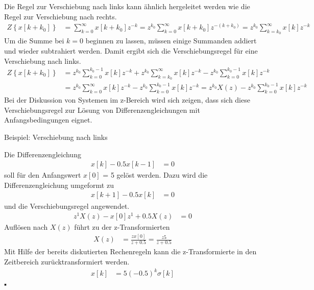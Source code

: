 Die Regel zur Verschiebung nach links kann ähnlich hergeleitet werden wie die Regel zur Verschiebung nach rechts.
\begin{align}
Z\left\{ x[ k + k_{0}] \right\} &= \sum\limits_{k = 0}^{\infty}{x[ k + k_{0}]  z^{- k}} = z^{k_{0}}  \sum\limits_{k = 0}^{\infty}{x[ k + k_{0}]  z^{- (k + k_{0})}} = z^{k_{0}}  \sum\limits_{k = k_{0}}^{\infty}{x[ k]  z^{- k}} \label{eq:5.44}
\end{align}
Um die Summe bei \(k = 0\) beginnen zu lassen, müssen einige Summanden addiert und wieder subtrahiert werden. Damit ergibt sich die Verschiebungsregel für eine Verschiebung nach links.
\begin{align}
{\boldsymbol{\mathit{Z}}\left\{x\left[k+k_{0} \right]\right\}} &=  {z^{k_{0} }  \sum\limits _{k=0}^{k_{0} -1}x\left[k\right] z^{-k}  +z^{k_{0} }  \sum\limits _{k=k_{0} }^{\infty }x\left[k\right] z^{-k}  -z^{k_{0} }  \sum\limits _{k=0}^{k_{0} -1}x\left[k\right] z^{-k}  } \\
{} &=  {z^{k_{0} }  \sum\limits _{k=0}^{\infty }x\left[k\right] z^{-k}  -z^{k_{0} }  \sum\limits _{k=0}^{k_{0} -1}x\left[k\right] z^{-k}  =z^{k_{0} }  X\left(z\right)-z^{k_{0} }  \sum\limits _{k=0}^{k_{0} -1}x\left[k\right] z^{-k}  }
\label{eq:5.45}
\end{align}
Bei der Diskussion von Systemen im z-Bereich wird sich zeigen, dass sich diese Verschiebungsregel zur Lösung von Differenzengleichungen mit Anfangsbedingungen eignet.

Beispiel: Verschiebung nach links

Die Differenzengleichung
\begin{align}
x[ k] - 0.5  x[ k - 1] &= 0 \label{eq:5.46}
\end{align}
soll für den Anfangswert \(x[0]\) = 5 gelöst werden. Dazu wird die Differenzengleichung umgeformt zu
\begin{align}
x[ k + 1] - 0.5  x[ k] &= 0 \label{eq:5.47}
\end{align}
und die Verschiebungsregel angewendet.
\begin{align}
z^{1}  X(z) - x[ 0]  z^{1} + 0.5  X(z) &= 0 \label{eq:5.48}
\end{align}
Auflösen nach \(X(z)\) führt zu der z-Transformierten
\begin{align}
X(z) &= \frac{z  x[ 0]}{z + 0.5} = \frac{z  5}{z + 0.5} \label{eq:5.49}
\end{align}
Mit Hilfe der bereits diskutierten Rechenregeln kann die z-Transformierte in den Zeitbereich zurücktransformiert werden.
\begin{align}
x[ k] &= 5  ( - 0.5)^{k}  \sigma[ k] \label{eq:5.50}
\end{align}
▪

